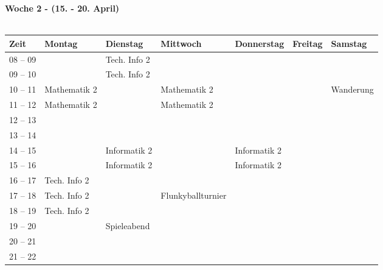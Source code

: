 \pagebreak
\textbf{Woche 2 - (15. - 20. April)}\\
\\
\begin{tabular}{|l|p{}|p{}|p{}|p{}|p{}|p{}|} \hline
 Zeit & Montag & Dienstag & Mittwoch & Donnerstag & Freitag & Samstag \\ \hline \hline
 08 -- 09 & &\footnotesize{Tech. Info 2} & & & &\\ \cline{1-1}
 09 -- 10 & &\footnotesize{Tech. Info 2} & & & &  \\ \cline{1-1}
 10 -- 11 &\footnotesize{Mathematik 2} & &\footnotesize{Mathematik 2} & & & \cellcolor{lightlightgray} \footnotesize{Wanderung}\\ \cline{1-1}
 11 -- 12 &\footnotesize{Mathematik 2} & &\footnotesize{Mathematik 2} & & &\cellcolor{lightlightgray}\\ \cline{1-1}
 12 -- 13 & & & & & &\cellcolor{lightlightgray} \\ \cline{1-1} 
 13 -- 14 & & & & & & \cellcolor{lightlightgray} \\ \cline{1-1}
 14 -- 15 & &\footnotesize{Informatik 2} & &\footnotesize{Informatik 2} & & \cellcolor{lightlightgray} \\ \cline{1-1}
 15 -- 16 & &\footnotesize{Informatik 2} & &\footnotesize{Informatik 2} & & \cellcolor{lightlightgray}\\ \cline {1-1}
 16 -- 17 & \footnotesize{Tech. Info 2}& & & & & \cellcolor{lightlightgray}\\ \cline{1-1}
 17 -- 18 &\footnotesize{Tech. Info 2} & &\cellcolor{lightlightgray} \footnotesize{Flunkyballturnier} & & & \\ \cline{1-1}
 18 -- 19 &\footnotesize{Tech. Info 2} & &\cellcolor{lightlightgray}  & & &  \\ \cline{1-1}
 19 -- 20 & &\cellcolor{lightlightgray} \footnotesize{Spieleabend} & \cellcolor{lightlightgray} & & & \\ \cline{1-1}
 20 -- 21 & &\cellcolor{lightlightgray} &\cellcolor{lightlightgray}  & & & \\ \cline{1-1}
 21 -- 22 & &\cellcolor{lightlightgray} & \cellcolor{lightlightgray} & & & \\ \hline
\end{tabular}
\\

